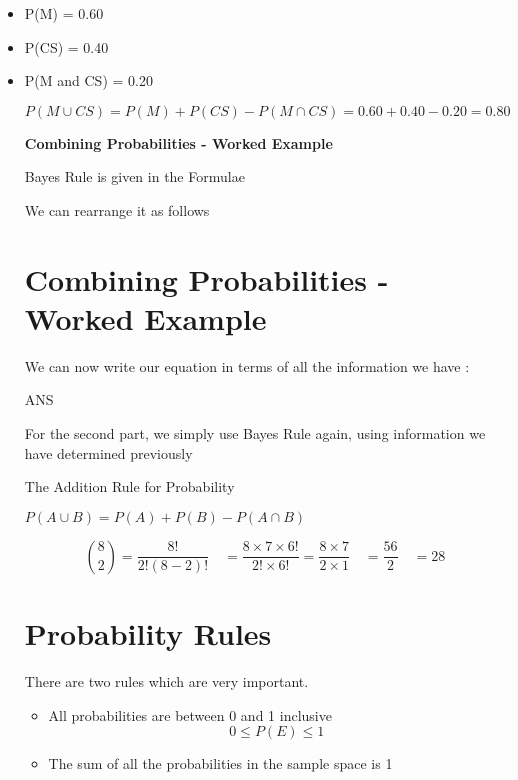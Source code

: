 \documentclass[]{report}
\begin{document}
\begin{itemize}
\item P(M) = 0.60
\item P(CS) = 0.40
\item P(M and CS) = 0.20

\[  P(M \cup CS) = P(M) + P(CS) - P(M \cap CS) 

= 0.60 + 0.40 -0.20 
= 0.80
\] 














\textbf{Combining Probabilities - Worked Example}

Bayes Rule is given in the Formulae  

We can rearrange it as follows  



\section{Combining Probabilities - Worked Example}
We can now write our equation in terms of all the information we have :

ANS

For the second part, we simply use Bayes Rule again, using information we have determined previously


The Addition Rule for Probability

$P(A \cup B ) = P(A) + P(B) - P(A \cap B)$

\[{8 \choose 2} =\frac{8!}{2!(8-2)!} \quad = \frac{8\times7\times6!}{2!\times 6!} = \frac{8\times7}{2\times 1} \quad = \frac{56}{2} \quad = 28\]


\section{Probability Rules}

There are two rules which are very important.
\begin{itemize}
\item All probabilities are between 0 and 1 inclusive
\[0 \leq P(E) \leq 1\]
\item The sum of all the probabilities in the sample space is 1



\end{itemize}
\end{itemize}
\end{document}
